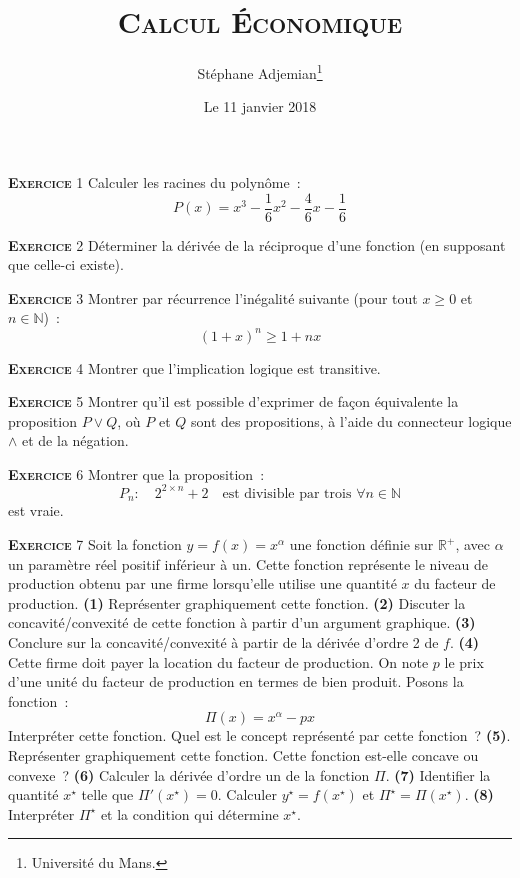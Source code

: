 \documentclass[10pt,a4paper,notitlepage,onecolumn]{article}
\newcommand{\exercice}[1]{\textsc{\textbf{Exercice}} #1}
\begin{document}
\title{\textsc{Calcul Économique}}
\author{Stéphane Adjemian\thanks{Université du Mans.}}
\date{Le 11 janvier 2018}

\maketitle
\thispagestyle{empty}

\exercice{1} Calculer les racines du polynôme :
\[
P(x) = x^3 - \frac{1}{6}x^2 - \frac{4}{6}x - \frac{1}{6}
\]    

\bigskip

\exercice{2} Déterminer la dérivée de la réciproque d'une fonction (en supposant que celle-ci existe).

\bigskip

\exercice{3} Montrer par récurrence l'inégalité suivante (pour tout $x\geq 0$ et $n\in\mathbb N$) :
\[
(1+x)^n \geq 1+nx
\]

\bigskip

\exercice{4} Montrer que l'implication logique est transitive.

\bigskip

\exercice{5} Montrer qu'il est possible d'exprimer de façon équivalente la proposition $P \lor Q$, où $P$ et $Q$
sont des propositions, à l'aide du connecteur logique $\land$ et de la négation.

\bigskip

\exercice{6} Montrer que la proposition :
\[
P_n: \quad 2^{2\times n}+2 \quad \text{est divisible par trois }\forall n\in\mathbb N 
\]
est vraie.

\bigskip

\exercice{7} Soit la fonction $y = f(x) = x^{\alpha}$ une fonction définie
sur $\mathbb R^+$, avec $\alpha$ un paramètre réel positif inférieur à
un. Cette fonction représente le niveau de production
obtenu par une firme lorsqu'elle utilise une quantité $x$ du facteur
de production. \textbf{(1)} Représenter graphiquement cette
fonction. \textbf{(2)} Discuter la concavité/convexité de cette
fonction à partir d'un argument graphique. \textbf{(3)} Conclure sur
la concavité/convexité à partir de la dérivée d'ordre 2 de
$f$. \textbf{(4)} Cette firme doit payer la location du facteur de
production. On note $p$ le prix d'une unité du facteur de
production en termes de bien produit. Posons la fonction :
\[
\Pi(x) = x^{\alpha} - p x
\]
Interpréter cette fonction. Quel est le concept représenté par cette
fonction ? \textbf{(5)}. Représenter graphiquement cette fonction. Cette fonction est-elle concave ou convexe ?
\textbf{(6)} Calculer la dérivée d'ordre un de la fonction
$\Pi$. \textbf{(7)} Identifier la quantité $x^{\star}$ telle que
$\Pi'(x^{\star}) = 0$. Calculer $y^{\star}=f(x^{\star})$ et
$\Pi^{\star} = \Pi(x^{\star})$. \textbf{(8)} Interpréter $\Pi^{\star}$
et la condition qui détermine $x^{\star}$.
\end{document}
